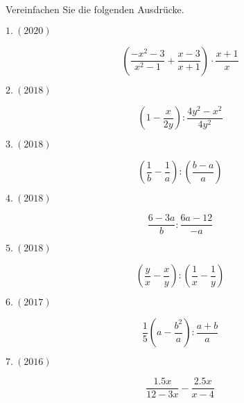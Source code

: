 




\usepackage{amssymb} %
\renewcommand{\metaHeaderLine}{Arbeitsblatt}
\renewcommand{\arbeitsblattTitel}{Bruchrechnen (alte GESO Maturaaufgaben)}

\arbeitsblattHeader{}
Vereinfachen Sie die folgenden Ausdrücke.

$1. \ (2020)$

$$\left(\frac{-x^2-3}{x^2-1} + \frac{x-3}{x+1}\right)\cdot{} \frac{x+1}{x}$$

$2.\ (2018)$

$$\left(1-\frac{x}{2y}\right) : \frac{4y^2 - x^2}{4y^2} $$
\noTRAINER{\newpage}

$3.\ (2018)$

$$\left(\frac{1}{b} - \frac{1}{a}\right) : \left(\frac{b-a}{a}\right)$$

$4.\ (2018)$

$$\frac{6-3a}{b} : \frac{6a-12}{-a}$$
\noTRAINER{\newpage}

$5.\ (2018)$

$$\left(\frac{y}{x} - \frac{x}{y}\right) : \left(\frac{1}{x}
- \frac{1}{y}\right)$$


$6.\ (2017)$

$$\frac{1}{5}\left(a-\frac{b^2}{a}\right) : \frac{a+b}{a}$$
\noTRAINER{\newpage}

$7.\ (2016)$

$$\frac{1.5x}{12-3x} - \frac{2.5x}{x-4}$$


